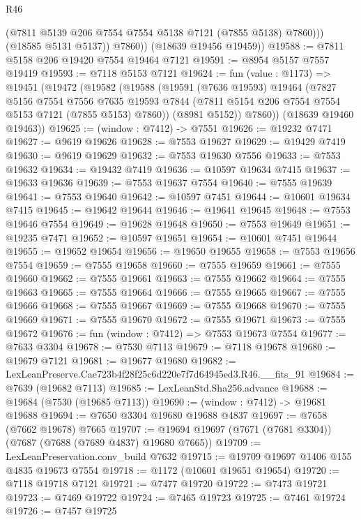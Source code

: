 \begin{lexlean}{R46}
\begin{coremodule}
                (@7811 @5139 @206 @7554 @7554 @5138 @7121 (@7855 @5138) @7860)))
            (@18585 @5131 @5137))
          @7860))
      (@18639 @19456 @19459))
@19588 := @7811 @5158 @206 @19420 @7554 @19464 @7121
@19591 := @8954 @5157 @7557 @19419
@19593 := @7118 @5153 @7121
@19624 := fun (value : @1173) =>
  @19451
    (@19472
      (@19582
        (@19588
          (@19591
            (@7636 @19593)
            @19464
            (@7827
              @5156
              @7554
              @7556
              @7635
              @19593
              @7844
              (@7811 @5154 @206 @7554 @7554 @5153 @7121 (@7855 @5153) @7860))
            (@8981 @5152))
          @7860))
      (@18639 @19460 @19463))
@19625 := (window : @7412) -> @7551
@19626 := @19232 @7471
@19627 := @9619 @19626
@19628 := @7553 @19627
@19629 := @19429 @7419
@19630 := @9619 @19629
@19632 := @7553 @19630 @7556
@19633 := @7553 @19632
@19634 := @19432 @7419
@19636 := @10597 @19634 @7415
@19637 := @19633 @19636
@19639 := @7553 @19637 @7554
@19640 := @7555 @19639
@19641 := @7553 @19640
@19642 := @10597 @7451
@19644 := @10601 @19634 @7415
@19645 := @19642 @19644
@19646 := @19641 @19645
@19648 := @7553 @19646 @7554
@19649 := @19628 @19648
@19650 := @7553 @19649
@19651 := @19235 @7471
@19652 := @10597 @19651
@19654 := @10601 @7451 @19644
@19655 := @19652 @19654
@19656 := @19650 @19655
@19658 := @7553 @19656 @7554
@19659 := @7555 @19658
@19660 := @7555 @19659
@19661 := @7555 @19660
@19662 := @7555 @19661
@19663 := @7555 @19662
@19664 := @7555 @19663
@19665 := @7555 @19664
@19666 := @7555 @19665
@19667 := @7555 @19666
@19668 := @7555 @19667
@19669 := @7555 @19668
@19670 := @7555 @19669
@19671 := @7555 @19670
@19672 := @7555 @19671
@19673 := @7555 @19672
@19676 := fun (window : @7412) => @7553 @19673 @7554
@19677 := @7633 @3304
@19678 := @7530 @7113
@19679 := @7118 @19678
@19680 := @19679 @7121
@19681 := @19677 @19680
@19682 := LexLeanPreserve.Cae723b4f28f25c6d220e7f7d64945ed3.R46.__fits_91
@19684 := @7639 (@19682 @7113)
@19685 := LexLeanStd.Sha256.advance
@19688 := @19684 (@7530 (@19685 @7113))
@19690 := (window : @7412) -> @19681 @19688
@19694 := @7650 @3304 @19680 @19688 @4837
@19697 := @7658 (@7662 @19678) @7665
@19707 := @19694 @19697 (@7671 (@7681 @3304)) (@7687 (@7688 (@7689 @4837) @19680 @7665))
@19709 := LexLeanPreservation.conv_build @7632
@19715 := @19709 @19697 @1406 @155 @4835 @19673 @7554
@19718 := @1172 (@10601 @19651 @19654)
@19720 := @7118 @19718 @7121
@19721 := @7477 @19720
@19722 := @7473 @19721
@19723 := @7469 @19722
@19724 := @7465 @19723
@19725 := @7461 @19724
@19726 := @7457 @19725

\end{coremodule}
\end{lexlean}
